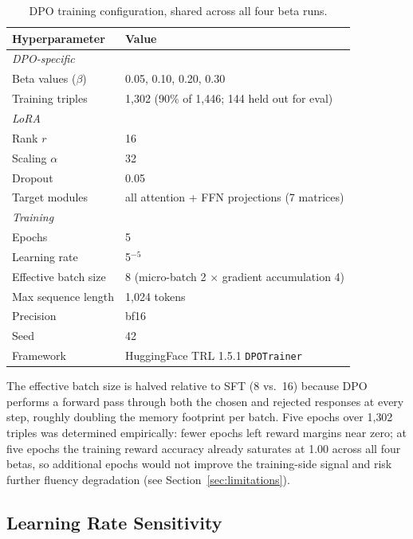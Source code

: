 \documentclass[../main.tex]{subfiles}
\begin{document}
\begin{table}[h]
\centering
\small
\begin{tabular}{ll}
\toprule
\textbf{Hyperparameter} & \textbf{Value} \\
\midrule
\multicolumn{2}{l}{\textit{DPO-specific}} \\
Beta values ($\beta$)     & 0.05, 0.10, 0.20, 0.30 \\
Training triples          & 1{,}302 (90\% of 1{,}446; 144 held out for eval) \\
\midrule
\multicolumn{2}{l}{\textit{LoRA}} \\
Rank $r$                  & 16 \\
Scaling $\alpha$           & 32 \\
Dropout                   & 0.05 \\
Target modules            & all attention + FFN projections (7 matrices) \\
\midrule
\multicolumn{2}{l}{\textit{Training}} \\
Epochs                    & 5 \\
Learning rate             & 5\texttimes10$^{-5}$ \\
Effective batch size      & 8 (micro-batch 2 $\times$ gradient accumulation 4) \\
Max sequence length       & 1{,}024 tokens \\
Precision                 & bf16 \\
Seed                      & 42 \\
Framework                 & HuggingFace TRL 1.5.1 \texttt{DPOTrainer} \\
\bottomrule
\end{tabular}
\caption{DPO training configuration, shared across all four beta runs.}
\label{tab:dpo_config}
\end{table}

The effective batch size is halved relative to SFT (8 vs.\ 16) because DPO performs a forward pass through both the chosen and rejected responses at every step, roughly doubling the memory footprint per batch. Five epochs over 1{,}302 triples was determined empirically: fewer epochs left reward margins near zero; at five epochs the training reward accuracy already saturates at 1.00 across all four betas, so additional epochs would not improve the training-side signal and risk further fluency degradation (see Section~\ref{sec:limitations}).

\subsection{Learning Rate Sensitivity}
\label{sec:lr_sensitivity}
\end{document}
